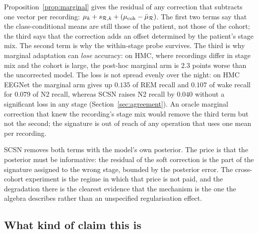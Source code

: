 Proposition~\ref{prop:marginal} gives the residual of any correction that
subtracts one vector per recording: $\mu_k+s_{\mathcal{R},k}+(\mu_{\mathrm{coh}}-\bar
\mu_{\mathcal{R}})$. The first two terms say that the class-conditional means are
still those of the patient, not those of the cohort; the third says that the
correction adds an offset determined by the patient's stage mix. The second
term is why the within-stage probe survives. The third is why marginal
adaptation can \emph{lose} accuracy: on HMC, where recordings differ in stage
mix and the cohort is large, the post-hoc marginal arm is $2.3$ points worse
than the uncorrected model. The loss is not spread evenly over the night: on
HMC EEGNet the marginal arm gives up $0.135$ of REM recall and $0.107$ of
wake recall for $0.079$ of N2 recall, whereas SCSN raises N2 recall by
$0.040$ without a significant loss in any stage
(Section~\ref{sec:agreement}). An oracle marginal correction that knew the
recording's stage mix would remove the third term but not the second; the
signature is out of reach of any operation that uses one mean per recording.

SCSN removes both terms with the model's own posterior. The price is that the
posterior must be informative: the residual of the soft correction is the part
of the signature assigned to the wrong stage, bounded by the posterior error.
The cross-cohort experiment is the regime in which that price is not paid, and
the degradation there is the clearest evidence that the mechanism is the one
the algebra describes rather than an unspecified regularisation effect.

\subsection{What kind of claim this is}

